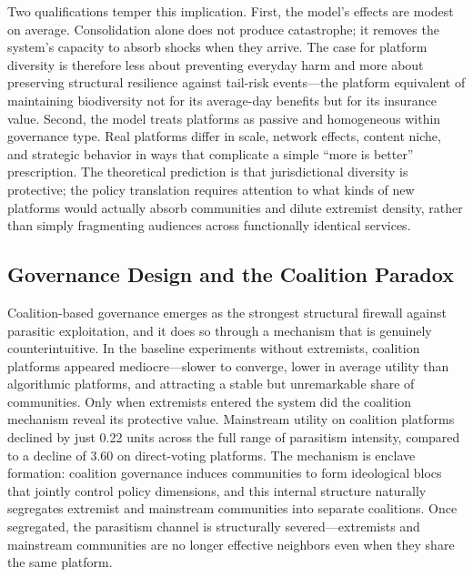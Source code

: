 \documentclass{article}
\begin{document}
Two qualifications temper this implication. First, the model's effects are modest on average. Consolidation alone does not produce catastrophe; it removes the system's capacity to absorb shocks when they arrive. The case for platform diversity is therefore less about preventing everyday harm and more about preserving structural resilience against tail-risk events---the platform equivalent of maintaining biodiversity not for its average-day benefits but for its insurance value. Second, the model treats platforms as passive and homogeneous within governance type. Real platforms differ in scale, network effects, content niche, and strategic behavior in ways that complicate a simple ``more is better'' prescription. The theoretical prediction is that jurisdictional diversity is protective; the policy translation requires attention to what kinds of new platforms would actually absorb communities and dilute extremist density, rather than simply fragmenting audiences across functionally identical services.

\subsection{Governance Design and the Coalition Paradox}

Coalition-based governance emerges as the strongest structural firewall against parasitic exploitation, and it does so through a mechanism that is genuinely counterintuitive. In the baseline experiments without extremists, coalition platforms appeared mediocre---slower to converge, lower in average utility than algorithmic platforms, and attracting a stable but unremarkable share of communities. Only when extremists entered the system did the coalition mechanism reveal its protective value. Mainstream utility on coalition platforms declined by just 0.22 units across the full range of parasitism intensity, compared to a decline of 3.60 on direct-voting platforms. The mechanism is enclave formation: coalition governance induces communities to form ideological blocs that jointly control policy dimensions, and this internal structure naturally segregates extremist and mainstream communities into separate coalitions. Once segregated, the parasitism channel is structurally severed---extremists and mainstream communities are no longer effective neighbors even when they share the same platform.
\end{document}
